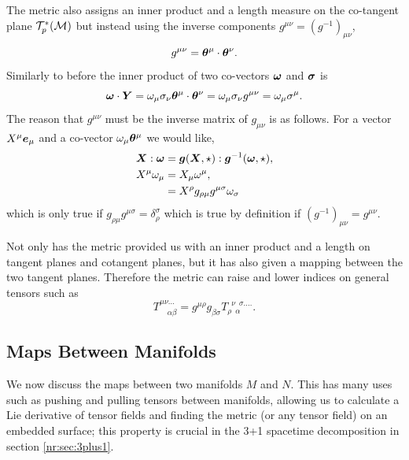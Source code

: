 The metric also assigns an inner product and a length measure on the co-tangent plane $\mathcal{T}^*_p(\mathcal{M})$ but instead using the inverse components $g^{\mu\nu} = (g^{-1})_{\mu\nu}$,
\begin{equation}
g^{\mu\nu} = \boldsymbol{\theta}^\mu \cdot \boldsymbol{\theta}^\nu.
\end{equation}
Similarly to before the inner product of two co-vectors $\boldsymbol{\omega}$ and $\boldsymbol{\sigma}$ is
\begin{equation}
\boldsymbol{\omega} \cdot \boldsymbol{Y} = \omega_\mu \sigma_\nu \boldsymbol{\theta}^\mu \cdot \boldsymbol{\theta}^\nu = \omega_\mu \sigma_\nu g^{\mu\nu} = \omega_\mu \sigma^\mu.
\end{equation}
The reason that $g^{\mu\nu}$ must be the inverse matrix of $g_{\mu\nu}$ is as follows. For a vector $X^\mu \boldsymbol{e}_\mu$ and a co-vector $\omega_\mu \boldsymbol{\theta}^\mu$ we would like, 
\begin{align}
\boldsymbol{X} : \boldsymbol{\omega} &= \boldsymbol{g}(\boldsymbol{X},\star) : \boldsymbol{g}^{-1}(\boldsymbol{\omega},\star) ,\\
X^\mu \omega_\mu  &= X_\mu \omega^\mu ,\\
&= X^\rho g_{\rho\mu}g^{\mu\sigma} \omega_\sigma
\end{align}
which is only true if $g_{\rho\mu}g^{\mu\sigma} = \delta^\sigma_\rho$ which is true by definition if $(g^{-1})_{\mu\nu} = g^{\mu\nu}$.

Not only has the metric provided us with an inner product and a length on tangent planes and cotangent planes, but it has also given a mapping between the two tangent planes. Therefore the metric can raise and lower indices on general tensors such as
\begin{equation}
T^{\mu\nu ...}_{\,\,\,\,\,\, \alpha \beta} = g^{\mu\rho}g_{\beta\sigma}T^{\,\,\, \nu \,\,\, \sigma ....}_{\rho \,\,\, \alpha}.
\end{equation}



\subsection{Maps Between Manifolds}\label{intro:sect:map}
We now discuss the maps between two manifolds $M$ and $N$. This has many uses such as pushing and pulling tensors between manifolds, allowing us to calculate a Lie derivative of tensor fields and finding the metric (or any tensor field) on an embedded surface; this property is crucial in the 3+1 spacetime decomposition in section \ref{nr:sec:3plus1}.

